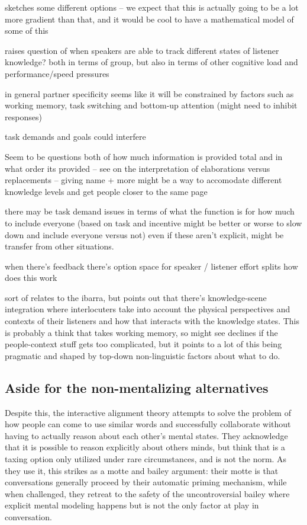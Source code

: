 \documentclass[]{article}
\begin{document}
\cite{yoon2018} sketches some different options -- we expect that this is actually going to be a lot more gradient than that, and it would be cool to have a mathematical model of some of this

\cite{yoon2018} raises question of when speakers are able to track different states of listener knowledge? both in terms of group, but also in terms of other cognitive load and performance/speed pressures 

in general partner specificity seems like it will be constrained by factors such as working memory, task switching and bottom-up attention (might need to inhibit responses) 

task demands and goals could interfere

Seem to be questions both of how much information is provided total and in what order its provided -- see \cite{yoon2018} on the interpretation of elaborations versus replacements -- giving name + more might be a way to accomodate different knowledge levels and get people closer to the same page 

\cite{yoon2019} there may be task demand issues in terms of what the function is for how much to include everyone (based on task and incentive might be better or worse to slow down and include everyone versus not) even if these aren't explicit, might be transfer from other situations. 

\cite{yoon2019} when there's feedback there's option space for speaker / listener effort splits how does this work 

sort of relates to the ibarra, but \cite{yoon2019a} points out that there's knowledge-scene integration where interlocuters take into account the physical perspectives and contexts of their listeners and how that interacts with the knowledge states. This is probably a think that takes working memory, so might see declines if the people-context stuff gets too complicated, but it points to a lot of this being pragmatic and shaped by top-down non-linguistic factors about what to do. 

\subsection{Aside for the non-mentalizing alternatives} 
Despite this, the interactive alignment theory attempts to solve the problem of how people can come to use similar words and successfully collaborate without having to actually reason about each other's mental states. They acknowledge that it is possible to reason explicitly about others minds, but think that is a taxing option only utilized under rare circumstances, and is not the norm. As they use it, this strikes as a motte and bailey argument: their motte is that conversations generally proceed by their automatic priming mechanism, while when challenged, they retreat to the safety of the uncontroversial bailey where explicit mental modeling happens but is not the only factor at play in conversation.  
\end{document}
